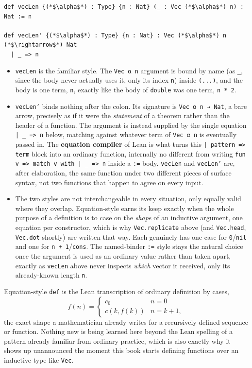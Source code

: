 \begin{lstlisting}
def vecLen {(*$\alpha$*) : Type} {n : Nat} (_ : Vec (*$\alpha$*) n) : Nat := n

def vecLen' {(*$\alpha$*) : Type} {n : Nat} : Vec (*$\alpha$*) n (*$\rightarrow$*) Nat
  | _ => n
\end{lstlisting}

\begin{itemize}
\tightlist
\item
  \texttt{vecLen} is the familiar style. The \texttt{Vec α n} argument is bound by name (as \texttt{\_\allowbreak{}}, since the body never actually uses it, only its index \texttt{n}) inside \texttt{(...)}, and the body is one term, \texttt{n}, exactly like the body of \texttt{double} was one term, \texttt{n * 2}.
\item
  \texttt{vecLen'} binds nothing after the colon. Its signature is \texttt{Vec α n → Nat}, a bare arrow, precisely as if it were the \emph{statement} of a theorem rather than the header of a function. The argument is instead supplied by the single equation \texttt{| \_\allowbreak{} => n} below, matching against whatever term of \texttt{Vec α n} is eventually passed in. The \textbf{equation compiler} of Lean is what turns this \texttt{| pattern => term} block into an ordinary function, internally no different from writing \texttt{fun v => match v with | \_\allowbreak{} => n} inside a \texttt{:=} body. \texttt{vecLen} and \texttt{vecLen'} are, after elaboration, the same function under two different pieces of surface syntax, not two functions that happen to agree on every input.
\item
  The two styles are not interchangeable in every situation, only equally valid where they overlap. Equation-style earns its keep exactly when the whole purpose of a definition is to case on the \emph{shape} of an inductive argument, one equation per constructor, which is why \texttt{Vec.replicate} above (and \texttt{Vec.head}, \texttt{Vec.dot} shortly) are written that way. Each genuinely has one case for \texttt{0}/\texttt{nil} and one for \texttt{n + 1}/\texttt{cons}. The named-binder \texttt{:=} style stays the natural choice once the argument is used as an ordinary value rather than taken apart, exactly as \texttt{vecLen} above never inspects \emph{which} vector it received, only its already-known length \texttt{n}.
\end{itemize}

\begin{mathreading}

Equation-style \texttt{def} is the Lean transcription of ordinary definition by cases, \[
f(n) = \begin{cases} c_0 & n = 0 \\ c(k, f(k)) & n = k + 1, \end{cases}
\] the exact shape a mathematician already writes for a recursively defined sequence or function. Nothing new is being learned here beyond the Lean spelling of a pattern already familiar from ordinary practice, which is also exactly why it shows up unannounced the moment this book starts defining functions over an inductive type like \texttt{Vec}.

\end{mathreading}

